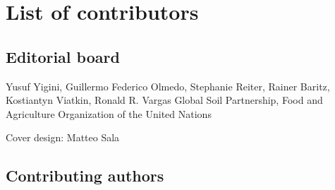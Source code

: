 \documentclass[10pt,b5paper,]{book}
\theoremstyle{definition}
\theoremstyle{definition}
\theoremstyle{definition}
\theoremstyle{remark}
\begin{document}
\frontmatter
{}   
\tableofcontents
\listoffigures
\listoftables
\printnomenclature

\hypertarget{list-of-contributors}{%
\chapter*{List of contributors}\label{list-of-contributors}}

\hypertarget{editorial-board}{%
\section*{Editorial board}\label{editorial-board}}

Yusuf Yigini, Guillermo Federico Olmedo, Stephanie Reiter, Rainer
Baritz, Kostiantyn Viatkin, Ronald R. Vargas Global Soil Partnership,
Food and Agriculture Organization of the United Nations

Cover design: Matteo Sala

\hypertarget{contributing-authors}{%
\section*{Contributing authors}\label{contributing-authors}}
\end{document}

